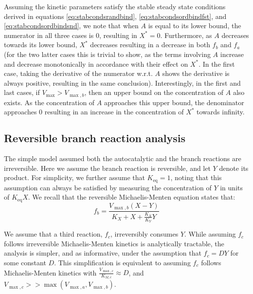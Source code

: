   Assuming the kinetic parameters satisfy the stable steady state conditions derived in equations \ref{eq:stabcondsrandbind}, \ref{eq:stabcondsordbindfst}, and \ref{eq:stabcondsordbindsnd}, we note that when $A$ is equal to its lower bound, the numerator in all three cases is $0$, resulting in $X^*=0$.
  Furthermore, as $A$ decreases towards its lower bound, $X^*$ decreases resulting in a decrease in both $f_b$ and $f_a$ (for the two latter cases this is trivial to show, as the terms involving $A$ increase and decrease monotonically in accordance with their effect on $X^*$. In the first case, taking the derivative of the numerator w.r.t. $A$ shows the derivative is always positive, resulting in the same conclusion).
  Interestingly, in the first and last cases, if $V_{\max}>V_{\max,b}$, then an upper bound on the concentration of $A$ also exists.
  As the concentration of $A$ approaches this upper bound, the denominator approaches $0$ resulting in an increase in the concentration of $X^*$ towards infinity.

  \label{sec:bisubstratedepassim}
\subsection{Reversible branch reaction analysis}
    The simple model assumed both the autocatalytic and the branch reactions are irreversible.
    Here we assume the branch reaction is reversible, and let $Y$ denote its product.
    For simplicity, we further assume that $K_{\text{eq}}=1$, noting that this assumption can always be satisfied by measuring the concentration of $Y$ in units of $K_{\text{eq}}X$.
    We recall that the reversible Michaelis-Menten equation states that:
   \begin{equation*}
       f_b=\frac{V_{\max,b}(X-Y)}{K_X+X+\frac{K_X}{K_Y}Y}
   \end{equation*}

   We assume that a third reaction, $f_c$, irreversibly consumes $Y$.
   While assuming $f_c$ follows irreversible Michaelis-Menten kinetics is analytically tractable, the analysis is simpler, and as informative, under the assumption that $f_c=DY$ for some constant $D$.
   This simplification is equivalent to assuming $f_c$ follows Michaelis-Menten kinetics with $\frac{V_{\max,c}}{K_{M,c}} \approx D$, and $V_{\max,c} >> \max(V_{\max,a},V_{\max,b})$.


